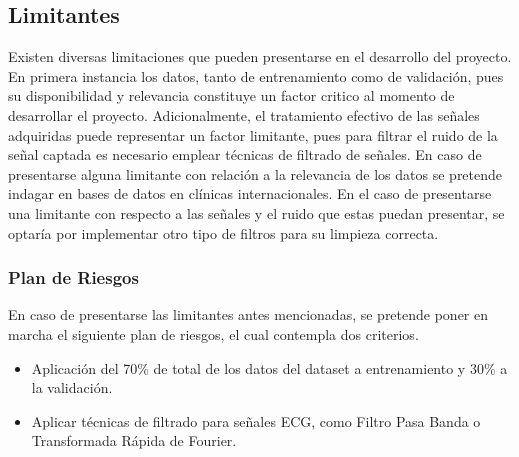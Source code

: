 \subsection{Limitantes}

Existen diversas limitaciones que pueden presentarse en el desarrollo del proyecto. En primera instancia los datos, tanto de entrenamiento como de validación, pues su disponibilidad y relevancia constituye un factor critico al momento de desarrollar el proyecto. Adicionalmente, el tratamiento efectivo de las señales adquiridas puede representar un factor limitante, pues para filtrar el ruido de la señal captada es necesario emplear técnicas de filtrado de señales. 
En caso de presentarse alguna limitante con relación a la relevancia de los datos se pretende indagar en bases de datos en clínicas internacionales. En el caso de presentarse una limitante con respecto a las señales y el ruido que estas puedan presentar, se optaría por implementar otro tipo de filtros para su limpieza correcta.

\subsubsection{Plan de Riesgos}

En caso de presentarse las limitantes antes mencionadas, se pretende poner en marcha el siguiente plan de riesgos, el cual contempla dos criterios.

\begin{itemize}
	\item Aplicación del 70\% de total de los datos del dataset a  entrenamiento y 30\% a la validación.
	\item Aplicar técnicas de filtrado para señales ECG, como Filtro Pasa Banda o Transformada Rápida de Fourier.
\end{itemize}
